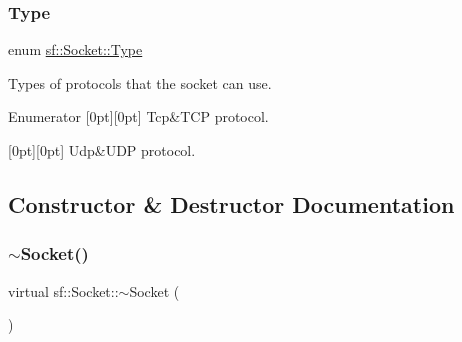 \subsubsection{\texorpdfstring{Type}{Type}}
{\footnotesize\ttfamily enum \mbox{\hyperlink{classsf_1_1_socket_a5d3ff44e56e68f02816bb0fabc34adf8}{sf\+::\+Socket\+::\+Type}}\hspace{0.3cm}{\ttfamily [protected]}}



Types of protocols that the socket can use. 

\begin{DoxyVerb}\end{DoxyVerb}
 \begin{DoxyEnumFields}{Enumerator}
[0pt][0pt]{}\mbox{\label{classsf_1_1_socket_a5d3ff44e56e68f02816bb0fabc34adf8acc02e97e90234b957eaad4dff7f22214}} 
Tcp&T\+CP protocol. \\
\hline

[0pt][0pt]{}\mbox{\label{classsf_1_1_socket_a5d3ff44e56e68f02816bb0fabc34adf8a6ebf3094830db4820191a327f3cc6ce2}} 
Udp&U\+DP protocol. \\
\hline

\end{DoxyEnumFields}


\subsection{Constructor \& Destructor Documentation}
\mbox{\label{classsf_1_1_socket_a79a4b5918f0b34a2f8db449089694788}} 
\subsubsection{\texorpdfstring{$\sim$Socket()}{~Socket()}}
{\footnotesize\ttfamily virtual sf\+::\+Socket\+::$\sim$\+Socket (\begin{DoxyParamCaption}{ }\end{DoxyParamCaption})\hspace{0.3cm}{\ttfamily [virtual]}}



